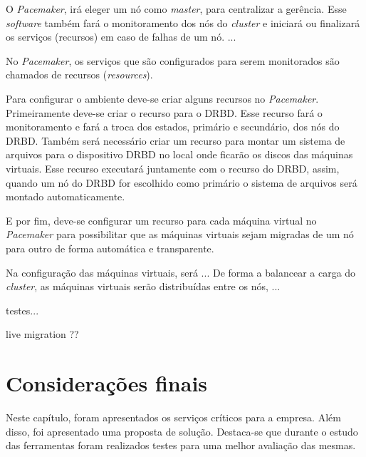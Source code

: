 O \textit{Pacemaker}, irá eleger um nó como \textit{master}, para centralizar a gerência. Esse \textit{software} 
também fará o monitoramento dos nós do \textit{cluster} e iniciará ou finalizará os serviços (recursos) em caso de falhas de um nó.
...

No \textit{Pacemaker}, os serviços que são configurados para serem monitorados são chamados de recursos (\textit{resources}).

Para configurar o ambiente deve-se criar alguns recursos no \textit{Pacemaker}. Primeiramente deve-se criar o recurso para o \ac{DRBD}. 
Esse recurso fará o monitoramento e fará a troca dos estados, primário e secundário, dos nós do \ac{DRBD}.
Também será necessário criar um recurso para montar um sistema de arquivos para o dispositivo \ac{DRBD} no local onde ficarão os discos das 
máquinas virtuais. Esse recurso executará juntamente com o recurso do \ac{DRBD}, assim, quando um nó do \ac{DRBD} for escolhido como primário 
o sistema de arquivos será montado automaticamente.

E por fim, deve-se configurar um recurso para cada máquina virtual no \textit{Pacemaker} para possibilitar que as
máquinas virtuais sejam migradas de um nó para outro de forma automática e transparente. 

Na configuração das máquinas virtuais, será ...
De forma a balancear a carga do \textit{cluster}, as máquinas virtuais serão distribuídas entre os nós, ...


testes...



live migration ??
% 

\section{Considerações finais}

Neste capítulo, foram apresentados os serviços críticos para a empresa. Além disso, foi apresentado uma proposta de solução. Destaca-se que 
durante o estudo das ferramentas foram realizados testes para uma melhor avaliação das mesmas.

